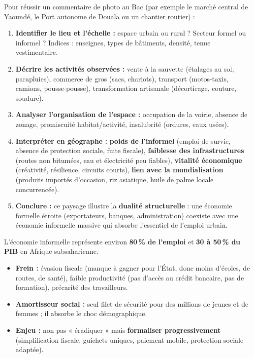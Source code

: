 \documentclass[11pt]{article}
\begin{document}
\begin{methode}
Pour réussir un commentaire de photo au Bac (par exemple le marché central de Yaoundé, le Port autonome de Douala ou un chantier routier) :
\begin{enumerate}
    \item \textbf{Identifier le lieu et l'échelle :} espace urbain ou rural ? Secteur formel ou informel ? Indices : enseignes, types de bâtiments, densité, tenue vestimentaire.
    \item \textbf{Décrire les activités observées :} vente à la sauvette (étalages au sol, parapluies), commerce de gros (sacs, chariots), transport (motos-taxis, camions, pousse-pousse), transformation artisanale (décorticage, couture, soudure).
    \item \textbf{Analyser l'organisation de l'espace :} occupation de la voirie, absence de zonage, promiscuité habitat/activité, insalubrité (ordures, eaux usées).
    \item \textbf{Interpréter en géographe :} \textbf{poids de l'informel} (emploi de survie, absence de protection sociale, fuite fiscale), \textbf{faiblesse des infrastructures} (routes non bitumées, eau et électricité peu fiables), \textbf{vitalité économique} (créativité, résilience, circuits courts), \textbf{lien avec la mondialisation} (produits importés d'occasion, riz asiatique, huile de palme locale concurrencée).
    \item \textbf{Conclure :} ce paysage illustre la \textbf{dualité structurelle} : une économie formelle étroite (exportateurs, banques, administration) coexiste avec une économie informelle massive qui absorbe l'essentiel de l'emploi urbain.
\end{enumerate}
\end{methode}

\begin{aretenir}
L'économie informelle représente environ \textbf{80\,\% de l'emploi} et \textbf{30 à 50\,\% du PIB} en Afrique subsaharienne.
\begin{itemize}
    \item \textbf{Frein :} évasion fiscale (manque à gagner pour l'État, donc moins d'écoles, de routes, de santé), faible productivité (pas d'accès au crédit bancaire, pas de formation), précarité des travailleurs.
    \item \textbf{Amortisseur social :} seul filet de sécurité pour des millions de jeunes et de femmes ; il absorbe le choc démographique.
    \item \textbf{Enjeu :} non pas « éradiquer » mais \textbf{formaliser progressivement} (simplification fiscale, guichets uniques, paiement mobile, protection sociale adaptée).
\end{itemize}
\end{aretenir}
\end{document}
